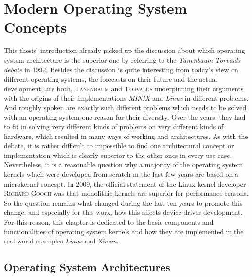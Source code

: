 
\chapter{Modern Operating System Concepts}\label{ch:modern-os-concepts}
This thesis' introduction already picked up the discussion about which operating system architecture is the superior one by referring to the \textit{Tanenbaum-Torvalds debate}\cite{linux-is-obsolete} in 1992.
Besides the discussion is quite interesting from today's view on different operating systems, the forecasts on their future and the actual development, are both, \textsc{Tanenbaum} and \textsc{Torvalds} underpinning their arguments with the origins of their implementations \textit{MINIX} and \textit{Linux} in different problems. 
And roughly spoken are exactly such different problems which needs to be solved with an operating system one reason for their diversity. 
Over the years, they had to fit in solving very different kinds of problems on very different kinds of hardware, which resulted in many ways of working and architectures. 
As with the debate, it is rather difficult to impossible to find one architectural concept or implementation which is clearly superior to the other ones in every use-case. 
Nevertheless, it is a reasonable question why a majority of the operating system kernels which were developed from scratch in the last few years are based on a microkernel concept.
In 2009, the official statement of the Linux kernel developer \textsc{Richard Gooch} was that monolithic kernels are superior for performance reasons\cite{why-linux-monolith}.
So the question remains what changed during the last ten years to promote this change, and especially for this work, how this affects device driver development.
For this reason, this chapter is dedicated to the basic components and functionalities of operating system kernels and how they are implemented in the real world examples \textit{Linux} and \textit{Zircon}.

\section{Operating System Architectures}\label{sec:kernel-arch-concepts}

